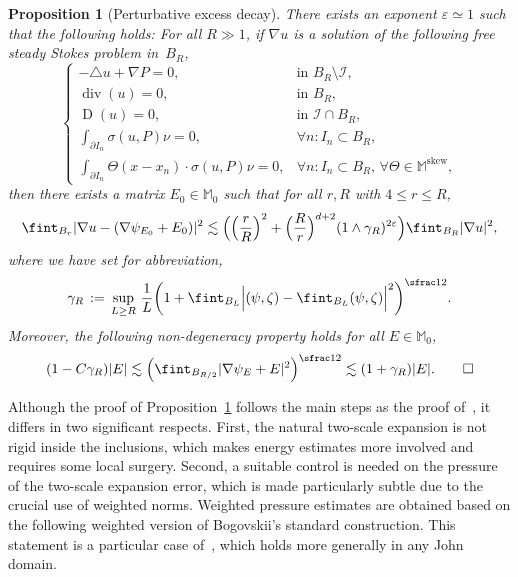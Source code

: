 \documentclass[JEP,XML,SOM,Unicode,published]{cedram}
\let\mathcal\mathscr
\theoremstyle{plain}
\newtheorem{propo}[theor]{Proposition}
\theoremstyle{definition}
\newcommand{\e}{\varepsilon}
\newcommand{\Ic}{\mathcal I}
\newcommand{\Md}{\mathbb M}
\newcommand{\D}{\operatorname{D}}
\newcommand{\Div}{{\operatorname{div}}}
\newcommand{\Skew}{{\operatorname{skew}}}
\begin{document}
\begin{propo}[Perturbative excess decay]\label{p1}
There exists an exponent $\e\simeq1$ such that the following holds:
For all $R\gg1$, if $\nabla u$ is a solution of the following free steady Stokes problem in~$B_R$,
\begin{equation}\label{eq:Stokes-zero}
\begin{cases}
-\triangle u+\nabla P=0,&\text{in $B_R\setminus\Ic$},\\
\Div(u)=0,&\text{in $B_R$},\\
\D(u)=0,&\text{in $\Ic\cap B_R$},\\
\int_{\partial I_n}\sigma(u,P)\nu=0,&\forall n:I_n \subset B_R,\\
\int_{\partial I_n}\Theta(x-x_n)\cdot\sigma(u,P)\nu=0,&\forall n:I_n \subset B_R,\,\forall\Theta\in\Md^\Skew,
\end{cases}
\end{equation}
then there exists a matrix $E_0\in\Md_0$
such that for all $r,R$ with $4\le r\le R$,
\begin{equation}\label{e.p1.1}
\fint_{B_r}|\nabla u-(\nabla\psi_{E_0}+E_0)|^2
\lesssim \Big(\Bigl(\frac{r}{R}\Bigr)^2+\Bigl(\frac{R}{r}\Bigr)^{d+2}(1\wedge\gamma_R)^{2\e}\Big)\fint_{B_R}|\nabla u|^2,
\end{equation}
where we have set for abbreviation,
\begin{equation}\label{e.p1.2}
\gamma_R \, :=\, \sup_{L\ge R}\,\frac{1}{L}\bigg(1+\fint_{B_L}\Big|(\psi,\zeta)-\fint_{B_L}(\psi,\zeta)\Big|^2\bigg)^{\sfrac12}.
\end{equation}
Moreover, the following non-degeneracy property holds for all $E\in\Md_0$,
\begin{equation}\label{e.p1.3}
(1-C\gamma_R) |E|\lesssim \Big(\fint_{B_{R/2}}|\nabla\psi_E+E|^2\Big)^{\sfrac12}\lesssim (1+\gamma_R)|E|.
\qedhere
\end{equation}
\end{propo}
Although the proof of Proposition~\ref{p1} follows the main steps as the proof of~\cite[Prop.\,1]{GNO-reg}, it differs in two
significant respects.
First, the natural two-scale expansion is not rigid inside the inclusions, which makes energy estimates more involved and requires some local surgery. Second, a suitable control is needed on the pressure of the two-scale expansion error, which is made particularly subtle due to the crucial use of weighted norms.
Weighted pressure estimates are obtained based on the following weighted version of Bogovskii's standard construction. This statement is a particular case of~\cite[Th.\,5.2]{DRS-10}, which holds more generally in any John domain.
\end{document}
